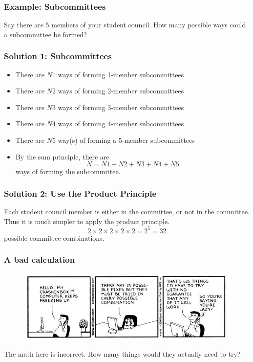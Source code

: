 \documentclass{beamer}
\newcommand{\<}{\langle}
\renewcommand{\>}{\rangle}
\begin{document}
\begin{frame}
\frametitle{Example: Subcommittees}

Say there are 5 members of your student council. How many possible ways could a subcommittee be formed?
\end{frame}

\begin{frame}
\frametitle{Solution 1: Subcommittees}

\begin{itemize}
\item There are $N1$ ways of forming 1-member subcommittees
\item There are $N2$ ways of forming 2-member subcommittees
\item There are $N3$ ways of forming 3-member subcommittees
\item There are $N4$ ways of forming 4-member subcommittees
\item There are $N5$ way(s) of forming a 5-member subcommittees
\item By the sum principle, there are
\[
N = N1+N2+N3+N4+N5
\]
ways of forming the subcommittee.
\end{itemize}
\end{frame}

\begin{frame}
\frametitle{Solution 2: Use the Product Principle}

Each student council member is either in the committee, or not in the committee. Thus it is much simpler to apply the product principle. 
\[
2 \times 2 \times 2 \times 2 \times 2= 2^5 = 32
\]
possible committee combinations.
\end{frame}


\begin{frame}
\frametitle{A bad calculation}

\begin{figure}
\includegraphics[scale=.5]{IMG/comic.jpg}
\end{figure}

The math here is incorrect. How many things would they actually need to try?
\end{frame}
\end{document}
